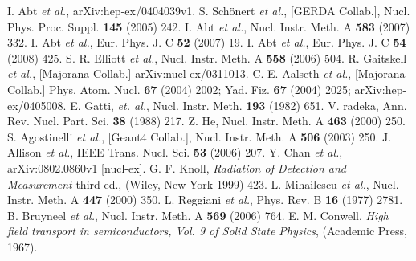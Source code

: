 \documentclass[epj]{svjour}
\begin{document}
%
\begin{thebibliography}{}
I. Abt \textit{et al.}, arXiv:hep-ex/0404039v1.
S. Sch\"onert \textit{et al.}, [GERDA Collab.],
Nucl. Phys. Proc. Suppl. \textbf{145} (2005) 242.
I. Abt \textit{et al.}, Nucl. Instr. Meth. A
\textbf{583} (2007) 332.
I. Abt \textit{et al.}, Eur. Phys. J. C \textbf{52}
(2007) 19.
I. Abt \textit{et al.}, Eur. Phys. J. C \textbf{54}
(2008) 425.
S. R. Elliott \textit{et al.}, Nucl. Instr. Meth. A
\textbf{558} (2006) 504.
R. Gaitskell \textit{et al.}, [Majorana Collab.]
arXiv:nucl-ex/0311013.
C. E. Aalseth \textit{et al.}, [Majorana Collab.]
Phys. Atom. Nucl. \textbf{67} (2004) 2002; Yad. Fiz. \textbf{67}
(2004) 2025; arXiv:hep-ex/0405008.
E. Gatti, \textit{et. al.},
Nucl. Instr. Meth. \textbf{193} (1982) 651.
V. radeka, Ann. Rev. Nucl. Part. Sci. \textbf{38}
(1988) 217.
Z. He, Nucl. Instr. Meth. A \textbf{463} (2000) 250.
S. Agostinelli \textit{et al.}, [Geant4 Collab.],
Nucl. Instr. Meth. A \textbf{506} (2003) 250.
J. Allison \textit{et al.}, IEEE
Trans. Nucl. Sci. \textbf{53} (2006) 207.
Y. Chan \textit{et al.}, arXiv:0802.0860v1 [nucl-ex].
G. F. Knoll, \textit{Radiation of Detection and
Measurement} third ed., (Wiley, New York 1999) 423.
L. Mihailescu \textit{et al.}, Nucl. Instr. Meth. A
\textbf{447} (2000) 350.
L. Reggiani \textit{et al.}, Phys. Rev. B \textbf{16}
(1977) 2781.
B. Bruyneel \textit{et al.}, Nucl. Instr. Meth. A
\textbf{569} (2006) 764.
E. M. Conwell, \textit{High field transport in
semiconductors, Vol. 9 of Solid State Physics}, (Academic Press,
1967).
\end{thebibliography}
%
\end{document}
